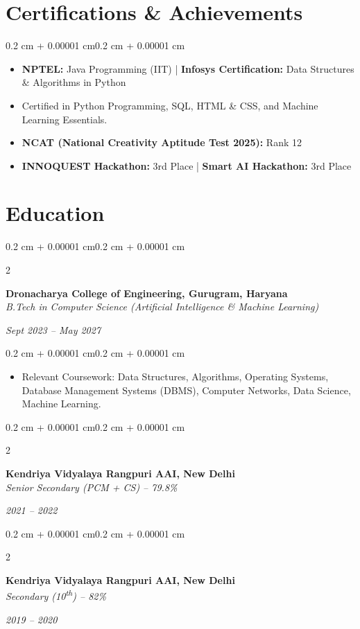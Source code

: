 \documentclass[10pt, letterpaper]{article}
\newenvironment{highlights}{
    \begin{itemize}[
        topsep=0.10 cm,
        parsep=0.10 cm,
        partopsep=0pt,
        itemsep=0pt,
        leftmargin=0.4 cm + 10pt
    ]
}{
    \end{itemize}
}
\newenvironment{onecolentry}{
    \begin{adjustwidth}{0.2 cm + 0.00001 cm}{0.2 cm + 0.00001 cm}
}{
    \end{adjustwidth}
}
\newenvironment{twocolentry}[2][]{
    \onecolentry
    \def\secondColumn{#2}
    \setcolumnwidth{\fill, 4.5 cm}
    \begin{paracol}{2}
}{
    \switchcolumn \raggedleft \secondColumn
    \end{paracol}
    \endonecolentry
}
\begin{document}
\section{Certifications \& Achievements}
\begin{onecolentry}
    \begin{highlights}
        \item \textbf{NPTEL:} Java Programming (IIT) \quad | \quad \textbf{Infosys Certification:} Data Structures \& Algorithms in Python
        \item Certified in Python Programming, SQL, HTML \& CSS, and Machine Learning Essentials.
        \item \textbf{NCAT (National Creativity Aptitude Test 2025):} Rank 12
        \item \textbf{INNOQUEST Hackathon:} 3rd Place \quad | \quad \textbf{Smart AI Hackathon:} 3rd Place
    \end{highlights}
\end{onecolentry}

\section{Education}

\begin{twocolentry}{
    \textit{Sept 2023 -- May 2027}
}
    \textbf{Dronacharya College of Engineering, Gurugram, Haryana} \\
    \textit{B.Tech in Computer Science (Artificial Intelligence \& Machine Learning)}
\end{twocolentry}

\begin{onecolentry}
    \begin{highlights}
        \item Relevant Coursework: Data Structures, Algorithms, Operating Systems, Database Management Systems (DBMS), Computer Networks, Data Science, Machine Learning.
    \end{highlights}
\end{onecolentry}

\begin{twocolentry}{
    \textit{2021 -- 2022}
}
    \textbf{Kendriya Vidyalaya Rangpuri AAI, New Delhi} \\
    \textit{Senior Secondary (PCM + CS) – 79.8\%}
\end{twocolentry}

\begin{twocolentry}{
    \textit{2019 -- 2020}
}
    \textbf{Kendriya Vidyalaya Rangpuri AAI, New Delhi} \\
    \textit{Secondary (10\textsuperscript{th}) – 82\%}
\end{twocolentry}
\end{document}
